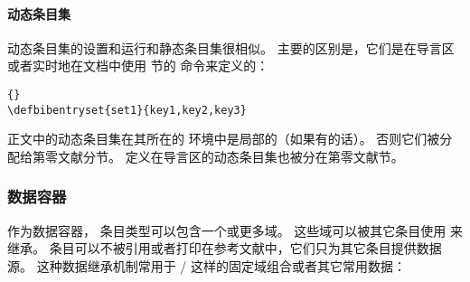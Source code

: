\paragraph[动态条目集]{动态条目集}


动态条目集的设置和运行和静态条目集很相似。
主要的区别是，它们是在导言区或者实时地在文档中使用  节的  命令来定义的：

\begin{lstlisting}[style=bibtex]{}
\defbibentryset{set1}{key1,key2,key3}
\end{lstlisting}
%
正文中的动态条目集在其所在的  环境中是局部的（如果有的话）。
否则它们被分配给第零文献分节。
定义在导言区的动态条目集也被分在第零文献节。

\subsubsection[数据容器]{数据容器}%
\label{use:use:xdat}


作为数据容器， 条目类型可以包含一个或更多域。
这些域可以被其它条目使用  来继承。
 条目可以不被引用或者打印在参考文献中，它们只为其它条目提供数据源。
这种数据继承机制常用于 \slash {} 这样的固定域组合或者其它常用数据：

